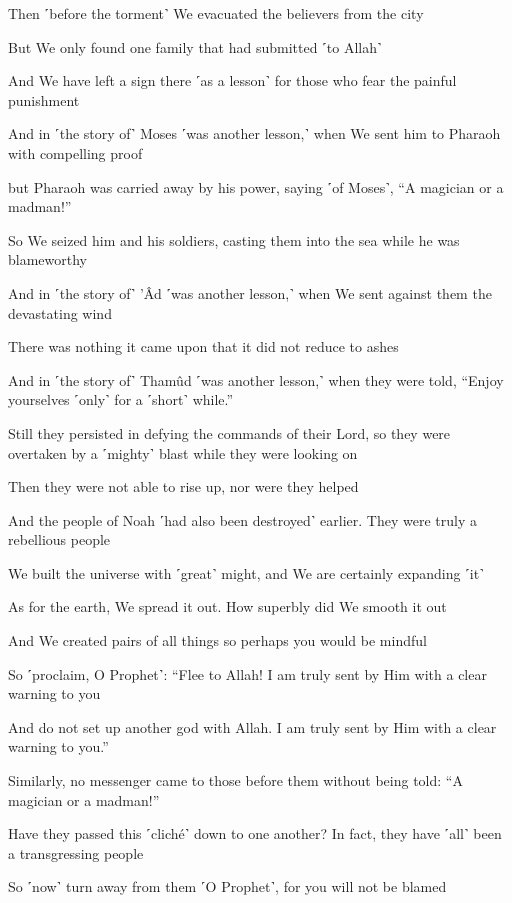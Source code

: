 Then ˹before the torment˺ We evacuated the believers from the city

But We only found one family that had submitted ˹to Allah˺

And We have left a sign there ˹as a lesson˺ for those who fear the painful punishment

And in ˹the story of˺ Moses ˹was another lesson,˺ when We sent him to Pharaoh with compelling proof

but Pharaoh was carried away by his power, saying ˹of Moses˺, “A magician or a madman!”

So We seized him and his soldiers, casting them into the sea while he was blameworthy

And in ˹the story of˺ ’Âd ˹was another lesson,˺ when We sent against them the devastating wind

There was nothing it came upon that it did not reduce to ashes

And in ˹the story of˺ Thamûd ˹was another lesson,˺ when they were told, “Enjoy yourselves ˹only˺ for a ˹short˺ while.”

Still they persisted in defying the commands of their Lord, so they were overtaken by a ˹mighty˺ blast while they were looking on

Then they were not able to rise up, nor were they helped

And the people of Noah ˹had also been destroyed˺ earlier. They were truly a rebellious people

We built the universe with ˹great˺ might, and We are certainly expanding ˹it˺

As for the earth, We spread it out. How superbly did We smooth it out

And We created pairs of all things so perhaps you would be mindful

So ˹proclaim, O Prophet˺: “Flee to Allah! I am truly sent by Him with a clear warning to you

And do not set up another god with Allah. I am truly sent by Him with a clear warning to you.”

Similarly, no messenger came to those before them without being told: “A magician or a madman!”

Have they passed this ˹cliché˺ down to one another? In fact, they have ˹all˺ been a transgressing people

So ˹now˺ turn away from them ˹O Prophet˺, for you will not be blamed

